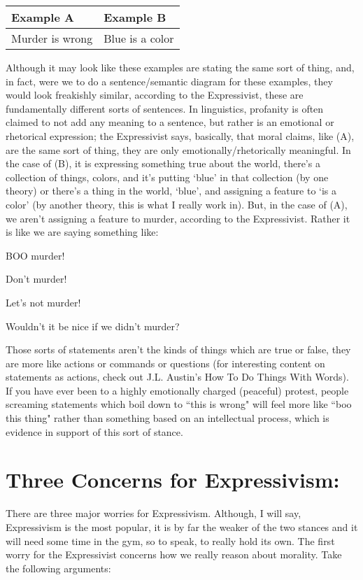 \noindent
\begin{tabular}{p{2.75in}|p{2.75in}}
Example A&Example B\\\hline
    Murder is wrong&Blue is a color
\end{tabular}

Although it may look like these examples are stating the same sort of thing, and, in fact, were we to  do a sentence/semantic diagram for these examples, they would look freakishly similar, according to the Expressivist, these are fundamentally different sorts of sentences. In linguistics, profanity is often claimed to not add any meaning to a sentence, but rather is an emotional or rhetorical expression; the Expressivist says, basically, that moral claims, like (A), are the same sort of thing, they are only emotionally/rhetorically meaningful. In the case of (B), it is expressing something true about the world, there's a collection of things, colors, and it's putting `blue' in that collection (by one theory) or there's a thing in the world, `blue', and assigning a feature to `is a color' (by another theory, this is what I really work in). But, in the case of (A), we aren’t assigning a feature to murder, according to the Expressivist. Rather it is like we are saying something like:

\begin{earg}
    \item[]BOO murder!
    \item[]Don’t murder!
    \item[]Let’s not murder!
    \item[]Wouldn’t it be nice if we didn’t murder?
\end{earg}
Those sorts of statements aren’t the kinds of things which are true or false, they are more like actions or commands or questions (for interesting content on statements as actions, check out J.L. Austin's How To Do Things With Words). If you have ever been to a highly emotionally charged (peaceful) protest, people screaming statements which boil down to ``this is wrong" will feel more like ``boo this thing" rather than something based on an intellectual process, which is evidence in support of this sort of stance. 

\section{Three Concerns for Expressivism:}

There are three major worries for Expressivism. Although, I will say, Expressivism is the most popular, it is by far the weaker of the two stances and it will need some time in the gym, so to speak, to really hold its own. The first worry for the Expressivist concerns how we really reason about morality. Take the following arguments:

